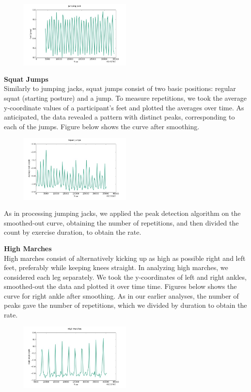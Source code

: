 \begin{figure} [htp]
	\includegraphics[width=0.5\textwidth]{images/jj}
\end{figure}

\textbf{Squat Jumps}  \\
Similarly to jumping jacks, squat jumps consist of two basic positions: regular squat (starting posture) and a jump. To measure repetitions, we took the average y-coordinate values of a participant's feet and plotted the averages over time. As anticipated, the data revealed a pattern with distinct peaks, corresponding to each of the jumps. Figure below shows the curve after smoothing.
\begin{figure} [htp]
	\includegraphics[width=0.5\textwidth]{images/sj}
\end{figure}
As in processing jumping jacks, we applied the peak detection algorithm on the smoothed-out curve, obtaining the number of repetitions, and then divided the count by exercise duration, to obtain the rate.

\textbf{High Marches} \\
High marches consist of alternatively kicking up as high as possible right and left feet, preferably while keeping knees straight. In analyzing high marches, we considered each leg separately. We took the y-coordinates of left and right ankles, smoothed-out the data and plotted it over time time. Figures below shows the curve for right ankle after smoothing. As in our earlier analyses, the number of peaks gave the number of repetitions, which we divided by duration to obtain the rate.
\begin{figure} [htp]
	\includegraphics[width=0.5\textwidth]{images/hm}
\end{figure}

